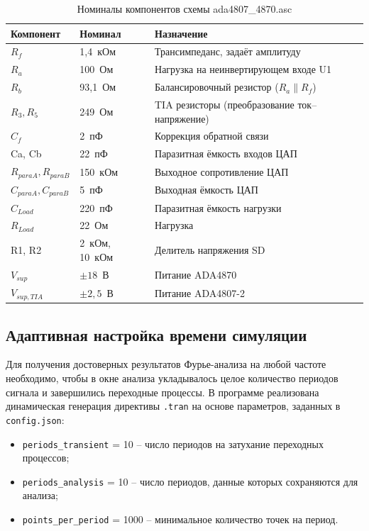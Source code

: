 \documentclass[a4paper, 12pt]{article}
\begin{document}
\begin{table}[H]
\centering
\caption{Номиналы компонентов схемы ada4807\_4870.asc}
\label{tab:components}
\begin{tabular}{@{}llp{6.5cm}@{}}
\toprule
\textbf{Компонент} & \textbf{Номинал} & \textbf{Назначение} \\
\midrule
\(R_f\)     & 1{,}4~кОм & Трансимпеданс, задаёт амплитуду \\
\(R_a\)     & 100~Ом   & Нагрузка на неинвертирующем входе U1 \\
\(R_b\)     & 93{,}1~Ом & Балансировочный резистор (\(R_a \parallel R_f\)) \\
\(R_3, R_5\) & 249~Ом   & TIA резисторы (преобразование ток--напряжение) \\
\(C_f\)     & 2~пФ     & Коррекция обратной связи \\
Ca, Cb     & 22~пФ    & Паразитная ёмкость входов ЦАП \\
\(R_{paraA}, R_{paraB}\) & 150~кОм & Выходное сопротивление ЦАП \\
\(C_{paraA}, C_{paraB}\) & 5~пФ   & Выходная ёмкость ЦАП \\
\(C_{Load}\)  & 220~пФ   & Паразитная ёмкость нагрузки \\
\(R_{Load}\)  & 22~Ом    & Нагрузка \\
R1, R2     & 2~кОм, 10~кОм & Делитель напряжения SD \\
\(V_{sup}\) & $\pm 18$~В & Питание ADA4870 \\
\(V_{sup,TIA}\) & $\pm 2{,}5$~В & Питание ADA4807-2 \\
\bottomrule
\end{tabular}
\end{table}

\subsection{Адаптивная настройка времени симуляции}
\label{sec:adaptive_tran}

Для получения достоверных результатов Фурье-анализа на любой частоте необходимо, чтобы в окне анализа укладывалось целое количество периодов сигнала и завершились переходные процессы. В программе реализована динамическая генерация директивы \texttt{.tran} на основе параметров, заданных в \texttt{config.json}:

\begin{itemize}
    \item \texttt{periods\_transient} = 10 – число периодов на затухание переходных процессов;
    \item \texttt{periods\_analysis} = 10 – число периодов, данные которых сохраняются для анализа;
    \item \texttt{points\_per\_period} = 1000 – минимальное количество точек на период.
\end{itemize}
\end{document}
